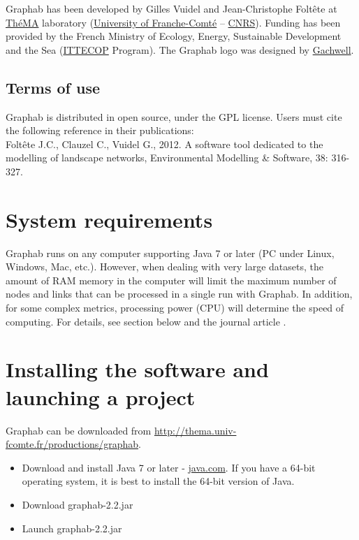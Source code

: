 \documentclass[a4paper,10pt]{report}
\begin{document}
Graphab has been developed by Gilles Vuidel and Jean-Christophe Foltête at \href{http://thema.univ-fcomte.fr/}{ThéMA} laboratory (\href{http://www.univ-fcomte.fr}{University of Franche-Comté} – \href{http://www.cnrs.fr}{CNRS}). Funding has been provided by the French Ministry of Ecology, Energy, Sustainable Development and the Sea (\href{http://www.ittecop.fr/}{ITTECOP} Program). The Graphab logo was designed by \href{http://www.gachwell.com/}{Gachwell}.

\subsection{Terms of use}

Graphab is distributed in open source, under the GPL license. Users must cite the following reference \cite{2012_graphab_EMS} in their publications:\\
Foltête J.C., Clauzel C., Vuidel G., 2012. A software tool dedicated to the modelling of landscape networks, Environmental Modelling \& Software, 38: 316-327.


\section{System requirements}

Graphab runs on any computer supporting Java 7 or later (PC under Linux, Windows, Mac, etc.). However, when dealing with very large datasets, the amount of RAM memory in the computer will limit the maximum number of nodes and links that can be processed in a single run with Graphab. In addition, for some complex metrics, processing power (CPU) will determine the speed of computing. For details, see section  below and the journal article  \cite{2012_graphab_EMS}.

\section{Installing the software and launching a project}

Graphab can be downloaded from \url{http://thema.univ-fcomte.fr/productions/graphab}.

\begin{itemize}
	\item Download and install Java 7 or later - \href{http://www.java.com}{java.com}. If you have a 64-bit operating system, it is best to install the 64-bit version of Java.
	\item Download graphab-2.2.jar
	\item Launch graphab-2.2.jar
\end{itemize}
\end{document}

